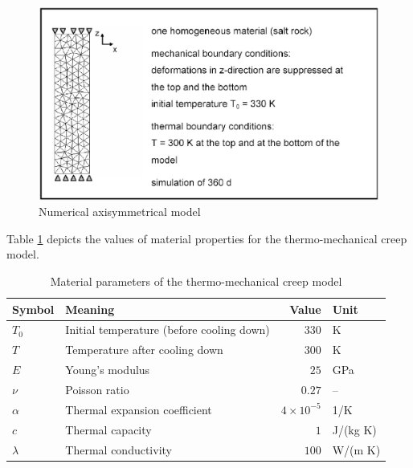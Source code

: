 \begin{figure}[H]
\centering
\includegraphics[scale=0.5]{M/creep_salt_2}
\caption{Numerical axisymmetrical model} \label{fig:creep_salt_2}
\end{figure}

Table \ref{tab:creep_salt_heat} depicts the values of material
properties for the thermo-mechanical creep model.
%
\begin{table}[H]
\center
\begin{tabular}{llrl}
\hline\noalign{\smallskip}
\hline
Symbol & Meaning & Value & Unit \\
\hline
$T_0$    & Initial temperature (before cooling down) & $330$ & K \\
$T$      & Temperature after cooling down & $300$ & K \\
$E$      & Young's modulus & $25$ & GPa \\
$\nu$    & Poisson ratio & $0.27$ & -- \\
$\alpha$ & Thermal expansion coefficient & $4\times 10^{-5}$ & 1/K \\
$c$      & Thermal capacity & $1$ & J/(kg K) \\
$\lambda$ & Thermal conductivity & $100$ & W/(m K) \\
\hline\hline
\end{tabular}
\caption{Material parameters of the thermo-mechanical creep model} %
\label{tab:creep_salt_heat}
\end{table}


